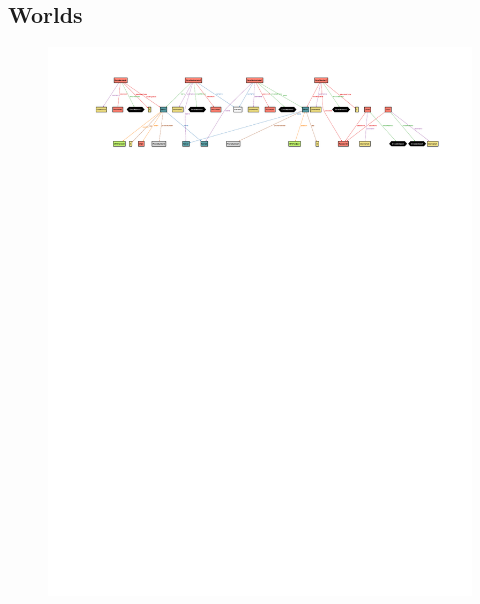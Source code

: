 \documentclass[table, 12pt]{article}
\begin{document}
\begin{flushleft}
\begin{landscape}
\begin{textblock}{20}
            \subsection{Worlds}
            \begin{figure}[H]
                \vspace{100px}
                \hspace{-100px}
                \includegraphics[scale=1.5]{assets/world.pdf}
            \end{figure}
        \end{textblock}
        \begin{figure}[H]
            \vspace*{-100px}
            \hspace*{-170px}

\end{figure}
\end{landscape}
\end{flushleft}
\end{document}
